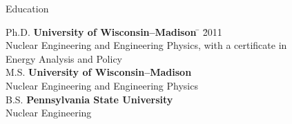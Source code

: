 \documentclass{resume3} %
\begin{document}

\begin{rSection}{Education}

\begin{tabbing}
Ph.D. \hspace*{2 em}\= \textbf{University of Wisconsin--Madison} \hspace*{5em} \= \hspace*{15em} \= 2011 \\
      \> Nuclear Engineering and Engineering Physics, with a certificate in \\ \> Energy Analysis and Policy \\
%
M.S. \hspace*{2 em}\> \textbf{University of Wisconsin--Madison} \>  \\
      \> Nuclear Engineering and Engineering Physics \\
%
B.S. \hspace*{2 em}\> \textbf{Pennsylvania State University} \>  \\
      \> Nuclear Engineering
\end{tabbing}
\end{rSection}
\end{document}
